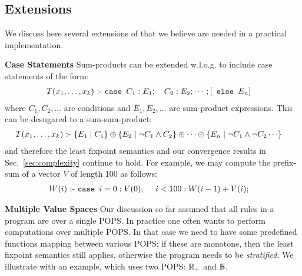 \subsection{Extensions}

\label{subsec:extensions:datalogo}

We discuss here several extensions of \datalogo that we believe are
needed in a practical implementation.

{\bf Case Statements} Sum-products can be extended w.l.o.g. to include
case statements of the form:
\begin{align*}
  T(x_1, \ldots, x_k) &\text{ :- } \texttt{case } C_1: E_1; \ \ \ C_2: E_2;\cdots; [\texttt{ else } E_n]
\end{align*}
%
where $C_1, C_2, \ldots$ are conditions and $E_1, E_2, \ldots$ are
sum-product expressions.  This can be desugared to a sum-sum-product:
%
\begin{align*}
  T(x_1, \ldots, x_k) &\text{ :- } \{{E_1}\mid{C_1}\} \oplus \{{E_2}\mid{\neg C_1 \wedge C_2}\} \oplus\cdots \oplus \{{E_n}\mid{\neg C_1 \wedge \neg C_2 \cdots}\}
\end{align*}
%
and therefore the least fixpoint semantics and our convergence results
in Sec.~\ref{sec:complexity} continue to hold.
%
For example, we may compute the prefix-sum of a vector $V$ of length
100 as follows:
%
\begin{align*}
  W(i) &\text{ :- } \texttt{case } i=0: V(0);\ \ \ \ i<100: W(i-1) + V(i);
\end{align*}
%

{\bf Multiple Value Spaces} Our discussion so far assumed that all
rules in a \datalogo program are over a single POPS.  In practice one
often wants to perform computations over multiple POPS.  In that case
we need to have some predefined functions mapping between various
POPS; if these are monotone, then the least fixpoint semantics still
applies, otherwise the program needs to be {\em stratified}.  We
illustrate with an example, which uses two POPS: $\mathbb R_+$ and $\mathbb B$.

